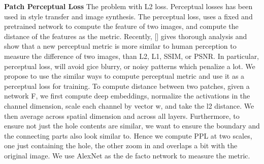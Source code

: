 \documentclass[runningheads]{llncs}
\begin{document}
\begin{table}[h!]
\begin{center}

  \end{center}
  \caption{Numerical comparison on 200 test images of ImageNet.}
  \vspace{-10pt}
  \label{table:numerical}
\end{table}

\noindent\textbf{Patch Perceptual Loss} The problem with L2 loss. Perceptual losses has been used in style transfer and image synthesis. The perceptual loss, uses a fixed and pretrained network to compute the feature of two images, and compute the distance of the features as the metric. Recently, [] gives thorough analysis and show that a new perceptual metric is more similar to human perception to measure the difference of two images, than L2, L1, SSIM, or PSNR. In particular, perceptual loss, will avoid gice blurry, or noisy patterns which penalize a lot. We propose to use the similar ways to compute perceptual metric and use it as a perceptual loss for training. To compute distance between two patches, given a network F, we first compute deep embeddings, normalize the activations in the channel dimension, scale each channel by vector w, and take the l2 distance. We then average across spatial dimension and across all layers. Furthermore, to ensure not just the hole contents are similar, we want to ensure the boundary and the connecting parts also look similar to. Hence we compute PPL at two scales, one just containing the hole, the other zoom in and overlaps a bit with the original image. We use AlexNet as the de facto network to measure the metric.
\end{document}

